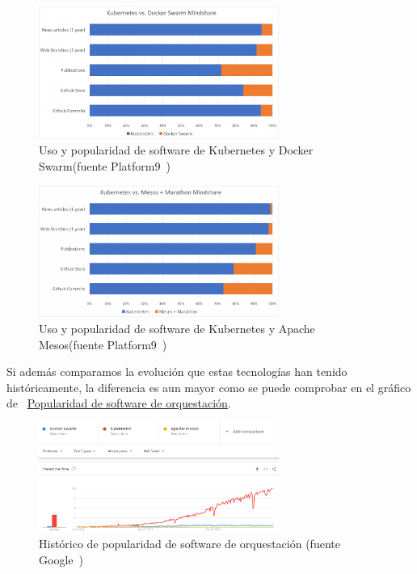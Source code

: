 \begin{figure}[hp]
  \centering
  \label{fig:KubernetesSwarm}
  \includegraphics[width=0.7\textwidth]{fig/KubernetesSwarm}
  \caption{Uso y popularidad de software de Kubernetes y Docker Swarm(fuente Platform9~\cite{KubernetesSwarm})}
\end{figure}

\begin{figure}[hp]
  \centering
  \label{fig:KubernetesMesos}
  \includegraphics[width=0.7\textwidth]{fig/KubernetesMesos}
  \caption{Uso y popularidad de software de Kubernetes y Apache Mesos(fuente Platform9~\cite{KubernetesMesos})}
\end{figure}

\par Si además comparamos la evolución que estas tecnologías han tenido históricamente, la diferencia es aun mayor como se puede comprobar en el gráfico de {~\hyperref[fig:orquestatorspopularity]{Popularidad de software de orquestación}}. 
\begin{figure}[hp]
  \centering
  \label{fig:orquestatorspopularity}
  \includegraphics[width=0.7\textwidth]{fig/KubernetesSwarmMesos}
  \caption{Histórico de popularidad de software de orquestación (fuente Google~\cite{KubernetesSwarmMesos})}
\end{figure}

